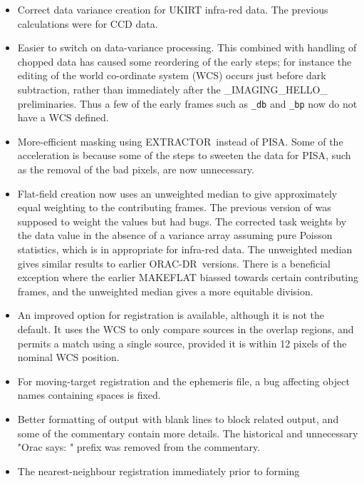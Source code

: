 \documentclass[twoside,11pt,nolof]{starlink}
\providecommand{\EXTRACTOR}{\mbox{\footnotesize EXTRACTOR}}
\providecommand{\ORACDR}{{\footnotesize ORAC-DR}}
\providecommand{\PISA}{{\footnotesize PISA}}
\begin{document}
\begin{itemize}
   \item Correct data variance creation for UKIRT infra-red data.  The
         previous calculations were for CCD data.
   \item Easier to switch on data-variance processing.  This combined
         with handling of chopped data has caused some reordering of
	 the early steps; for instance the editing of the world
	 co-ordinate system (WCS) occurs just before dark subtraction,
	 rather than immediately after the \_IMAGING\_HELLO\_
	 preliminaries.  Thus a few of the early frames such as
	 {\tt\_db} and {\tt\_bp} now do not have a WCS defined.
   \item More-efficient masking using \EXTRACTOR\ instead of \PISA.
         Some of the acceleration is because some of the steps to
	 sweeten the data for \PISA, such as the removal of the bad
	 pixels, are now unnecessary.
   \item Flat-field creation now uses an unweighted median to give
         approximately equal weighting to the contributing frames.
         The previous version of  was
         supposed to weight the values but had bugs.  The corrected
         task weights by the data value in the absence of a variance
         array assuming pure Poisson statistics, which is in appropriate
         for infra-red data.  The unweighted median gives similar
         results to earlier \ORACDR\ versions.  There is a beneficial
         exception where the earlier MAKEFLAT biassed towards certain
         contributing frames, and the unweighted median gives a more
         equitable division.
   \item An improved option for registration is available, although it
         is not the default.  It uses the WCS to only compare sources
         in the overlap regions, and permits a match using a single source,
         provided it is within 12 pixels of the nominal WCS position.
   \item For moving-target registration and the ephemeris file, a bug
         affecting object names containing spaces is fixed.
   \item Better formatting of output with blank lines to block related
         output, and some of the commentary contain more details.  The
         historical and unnecessary "Orac says: " prefix was removed
         from the commentary.
   \item The nearest-neighbour registration immediately prior to forming

\end{itemize}
\end{document}
